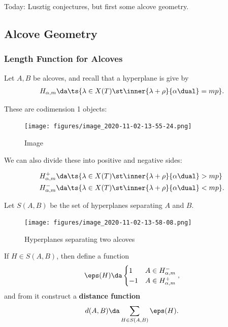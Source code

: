 Today: Lusztig conjectures, but first some alcove geometry.

\hypertarget{alcove-geometry}{%
\subsection{Alcove Geometry}\label{alcove-geometry}}

\hypertarget{length-function-for-alcoves}{%
\subsubsection{Length Function for
Alcoves}\label{length-function-for-alcoves}}

Let \(A, B\) be alcoves, and recall that a hyperplane is give by
\begin{align*}  
H_{\alpha, m} \da \ts{ \lambda \in X(T) \st \inner{\lambda + \rho}{\alpha\dual} = mp }
.\end{align*}

These are codimension 1 objects:

\begin{figure}
\centering
\texttt{[image: figures/image\_2020-11-02-13-55-24.png]}
\caption{Image}
\end{figure}

We can also divide these into positive and negative sides:

\begin{align*}  
H_{\alpha, m}^+ &\da \ts{   \lambda \in X(T) \st \inner{\lambda + \rho}{\alpha\dual} > mp } \\
H_{\alpha, m}^- &\da \ts{   \lambda \in X(T) \st \inner{\lambda + \rho}{\alpha\dual} < mp } 
.\end{align*}

Let \(S(A, B)\) be the set of hyperplanes separating \(A\) and \(B\).

\begin{figure}
\centering
\texttt{[image: figures/image\_2020-11-02-13-58-08.png]}
\caption{Hyperplanes separating two alcoves}
\end{figure}

If \(H\in S(A, B)\), then define a function
\begin{align*}  
\eps(H) \da
\begin{cases}
1 & A\in H_{\alpha, m}^- \\
-1 & A\in H_{\alpha, m}^+
\end{cases}
,\end{align*} and from it construct a \textbf{distance function}
\begin{align*}  
d(A, B) \da \sum_{H\in S(A, B)} \eps(H)
.\end{align*}

